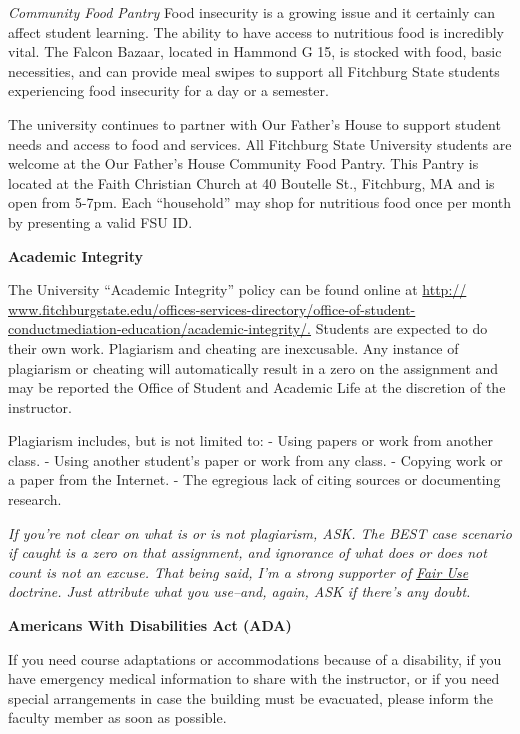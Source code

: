 \documentclass[
  letterpaper,
  DIV=11,
  numbers=noendperiod,
  oneside]{scrartcl}
\begin{document}
\emph{Community Food Pantry} Food insecurity is a growing issue and it
certainly can affect student learning. The ability to have access to
nutritious food is incredibly vital. The Falcon Bazaar, located in
Hammond G 15, is stocked with food, basic necessities, and can provide
meal swipes to support all Fitchburg State students experiencing food
insecurity for a day or a semester.

The university continues to partner with Our Father's House to support
student needs and access to food and services. All Fitchburg State
University students are welcome at the Our Father's House Community Food
Pantry. This Pantry is located at the Faith Christian Church at 40
Boutelle St., Fitchburg, MA and is open from 5-7pm. Each ``household''
may shop for nutritious food once per month by presenting a valid FSU
ID.

\textbf{Academic Integrity}

The University ``Academic Integrity'' policy can be found online at
\href{http://www.fitchburgstate.edu/offices-services-directory/office-of-student-conduct-mediation-education/academic-integrity/}{http://
www.fitchburgstate.edu/offices-services-directory/office-of-student-conductmediation-education/academic-integrity/.}
Students are expected to do their own work. Plagiarism and cheating are
inexcusable. Any instance of plagiarism or cheating will automatically
result in a zero on the assignment and may be reported the Office of
Student and Academic Life at the discretion of the instructor.

Plagiarism includes, but is not limited to: - Using papers or work from
another class. - Using another student's paper or work from any class. -
Copying work or a paper from the Internet. - The egregious lack of
citing sources or documenting research.

\emph{If you're not clear on what is or is not plagiarism, ASK. The BEST
case scenario if caught is a zero on that assignment, and ignorance of
what does or does not count is not an excuse. That being said, I'm a
strong supporter of}
\href{https://en.wikipedia.org/wiki/Fair_Use}{\emph{Fair Use}}
\emph{doctrine. Just attribute what you use--and, again, ASK if there's
any doubt.}

\textbf{Americans With Disabilities Act (ADA)}

If you need course adaptations or accommodations because of a
disability, if you have emergency medical information to share with the
instructor, or if you need special arrangements in case the building
must be evacuated, please inform the faculty member as soon as possible.
\end{document}
